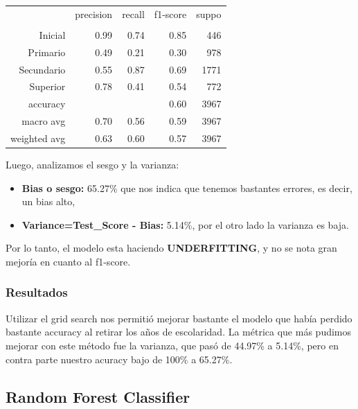 \documentclass[a4paper]{article}
\begin{document}
            \begin{table}[H]
                \centering
                \begin{tabular}{rrrrr}
                    ~ & precision & recall & f1-score & suppo \\
                    & & & & \\
                    Inicial    & 0.99 & 0.74 & 0.85 & 446 \\
                    Primario   & 0.49 & 0.21 & 0.30 & 978 \\
                    Secundario & 0.55 & 0.87 & 0.69 & 1771 \\
                    Superior   & 0.78 & 0.41 & 0.54 & 772 \\
                    accuracy & & & 0.60 & 3967 \\
                    macro avg & 0.70 & 0.56 & 0.59 & 3967 \\
                    weighted avg & 0.63 & 0.60 & 0.57 & 3967 \\
                \end{tabular}
            \end{table}

            Luego, analizamos el sesgo y la varianza:
            \begin{itemize}
                \item \textbf{Bias o sesgo:} 65.27\% que nos indica que tenemos bastantes errores, es decir, un bias alto,
                \item \textbf{Variance=Test\_Score - Bias:} 5.14\%, por el otro lado la varianza es baja.
            \end{itemize}

            Por lo tanto, el modelo esta haciendo \textbf{UNDERFITTING}, y no se nota gran mejoría en cuanto al f1-score.

            \subsubsection*{Resultados}

            Utilizar el grid search nos permitió mejorar bastante el modelo que había perdido bastante accuracy al retirar los años de escolaridad. La métrica que más pudimos mejorar con este método fue la varianza, que pasó de 44.97\% a 5.14\%, pero en contra parte nuestro acuracy bajo de 100\% a 65.27\%.

    \subsection{Random Forest Classifier}
        
\end{document}
